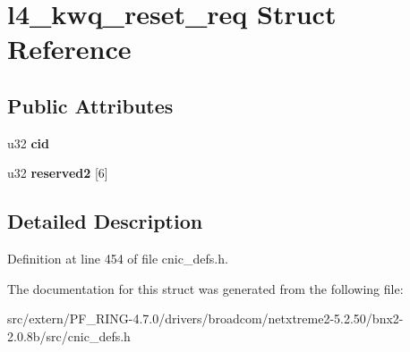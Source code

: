 \hypertarget{structl4__kwq__reset__req}{
\section{l4\_\-kwq\_\-reset\_\-req Struct Reference}
\label{structl4__kwq__reset__req}
}
\subsection*{Public Attributes}
\begin{DoxyCompactItemize}
\item 
\hypertarget{structl4__kwq__reset__req_ae4d8282e4017caac247f2f96760ebe97}{
u32 {\bfseries cid}}
\label{structl4__kwq__reset__req_ae4d8282e4017caac247f2f96760ebe97}

\item 
\hypertarget{structl4__kwq__reset__req_a6d1c77737d939dde61f327ce15c8f485}{
u32 {\bfseries reserved2} \mbox{[}6\mbox{]}}
\label{structl4__kwq__reset__req_a6d1c77737d939dde61f327ce15c8f485}

\end{DoxyCompactItemize}


\subsection{Detailed Description}


Definition at line 454 of file cnic\_\-defs.h.



The documentation for this struct was generated from the following file:\begin{DoxyCompactItemize}
\item 
src/extern/PF\_\-RING-\/4.7.0/drivers/broadcom/netxtreme2-\/5.2.50/bnx2-\/2.0.8b/src/cnic\_\-defs.h\end{DoxyCompactItemize}
